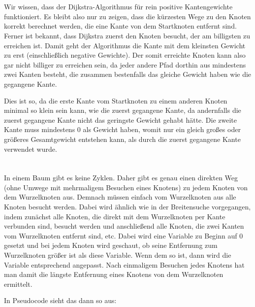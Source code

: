 \documentclass[10pt,a4paper,oneside,ngerman,numbers=noenddot]{scrartcl}
\begin{document}
\section{} %
	Wir wissen, dass der Dijkstra-Algorithmus für rein positive Kantengewichte funktioniert. Es bleibt also nur zu zeigen, dass die kürzesten Wege zu den Knoten korrekt berechnet werden, die eine Kante von dem Startknoten entfernt sind. Ferner ist bekannt, dass Dijkstra zuerst den Knoten besucht, der am billigsten zu erreichen ist. Damit geht der Algorithmus die Kante mit dem kleinsten Gewicht zu erst (einschließlich negative Gewichte). Der somit erreichte Knoten kann also gar nicht billiger zu erreichen sein, da jeder andere Pfad dorthin aus mindestens zwei Kanten besteht, die zusammen bestenfalls das gleiche Gewicht haben wie die gegangene Kante.
	
	Dies ist so, da die erste Kante vom Startknoten zu einem anderen Knoten minimal so klein sein kann, wie die zuerst gegangene Kante, da andernfalls die zuerst gegangene Kante nicht das geringste Gewicht gehabt hätte. Die zweite Kante muss mindestens 0 als Gewicht haben, womit nur ein gleich großes oder größeres Gesamtgewicht entstehen kann, als durch die zuerst gegangene Kante verwendet wurde.
\section{} %
	\subsection{} %
		In einem Baum gibt es keine Zyklen. Daher gibt es genau einen direkten Weg (ohne Umwege mit mehrmaligem Besuchen eines Knotens) zu jedem Knoten von dem Wurzelknoten aus. Demnach müssen einfach vom Wurzelknoten aus alle Knoten besucht werden. Dabei wird ähnlich wie in der Breitensuche vorgegangen, indem zunächst alle Knoten, die direkt mit dem Wurzelknoten per Kante verbunden sind, besucht werden und anschließend alle Knoten, die zwei Kanten vom Wurzelknoten entfernt sind, etc. Dabei wird eine Variable zu Beginn auf 0 gesetzt und bei jedem Knoten wird geschaut, ob seine Entfernung zum Wurzelknoten größer ist als diese Variable. Wenn dem so ist, dann wird die Variable entsprechend angepasst. Nach einmaligem Besuchen jedes Knotens hat man damit die längste Entfernung eines Knotens von dem Wurzelknoten ermittelt.
		
		In Pseudocode sieht das dann so aus:
\end{document}
